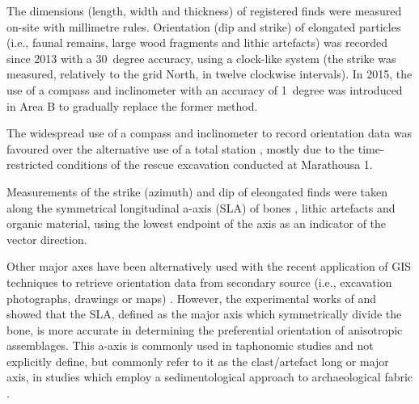\documentclass[preprint,authoryear,times]{elsarticle} %
\begin{document}
The dimensions (length, width and thickness) of registered finds were measured on-site with millimetre rules. Orientation (dip and strike) of elongated particles (i.e., faunal remains, large wood fragments and lithic artefacts) was recorded since 2013 with a 30~degree accuracy, using a clock-like system (the strike was measured, relatively to the grid North, in twelve clockwise intervals). In 2015, the use of a compass and inclinometer with an accuracy of 1~degree was introduced in Area B to gradually replace the former method.

The widespread use of a compass and inclinometer to record orientation data \citep[][among others]{Voorhies1966,Bertran1995,Bertran1997,Lenoble2004,Eberth2007,Eren2010,Benito-Calvo2011a,Dominguez-Rodrigo2012,Dominguez-Rodrigo2013,Dominguez-Rodrigo2014,Cobo-Sanchez2014,Organista2017} was favoured over the alternative use of a total station \citep[][among others]{Kluskens1990,Dibble1997,McPherron2005,Enloe2006,Bernatchez2010}, mostly due to the time-restricted conditions of the rescue excavation conducted at Marathousa 1.

Measurements of the strike (azimuth) and dip of eleongated finds were taken along the symmetrical longitudinal a-axis (SLA) of bones \citep{Dominguez-Rodrigo2013}, lithic artefacts \citep{Bertran1995} and organic material, using the lowest endpoint of the axis as an indicator of the vector direction.

Other major axes have been alternatively used with the recent application of GIS techniques to retrieve orientation data from secondary source (i.e., excavation photographs, drawings or maps) \citep{Boschian2010,Benito-Calvo2011,Torre2013a,Walter2013,Garcia-Moreno2016,Sanchez-Romero2016}. %
However, the experimental works of \cite{Dominguez-Rodrigo2013} and \cite{Dominguez-Rodrigo2014} showed that the SLA, defined as the major axis which symmetrically divide the bone, is more accurate in determining the preferential orientation of anisotropic assemblages. This a-axis is commonly used in taphonomic studies \citep[][among others]{Toots1965,Voorhies1969,Ebert2007,Dominguez-Rodrigo2012,Dominguez-Rodrigo2014c,Aramendi2017} %
and not explicitly define, but commonly refer to it as the clast/artefact long or major axis, in studies which employ a sedimentological approach to archaeological fabric \citep[][among others]{Bertran1995,Bertran1997,Lenoble2004,Benito-Calvo2009}. %
\end{document}
